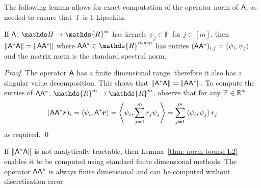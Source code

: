 \documentclass[smallextended]{svjour3}
\let\F\mathds\let\C\mathcal\newcommand{\R}{\F{R}}\newcommand{\A}{\tens{A}}
\newcommand{\norm}[1]{{\left\lVert #1 \right\rVert}}
\newcommand{\IP}[2]{\left\langle #1,#2 \right\rangle}
\newcommand{\op}[1]{\operatorname{#1}}
\newcommand{\1}{\F{1}}
\begin{document}
	The following lemma allows for exact computation of the operator norm of $\A$, as needed to ensure that $\op{f}$ is 1-Lipschitz.
	\begin{lemma}\label{thm: norm bound L2}
		If $\A\colon \F H \to \R^m$ has kernels $\psi_j\in \F H$ for $j\in[m]$, then
		$ \norm{\A^*\A} = \norm{\A\A^*} $
		where $\A\A^*\in\R^{m\times m}$ has entries $(\A\A^*)_{i,j} = \IP{\psi_i}{\psi_j}$
		and the matrix norm is the standard spectral norm.
	\end{lemma}
	\begin{proof}
		The operator $\A$ has a finite dimensional range, therefore it also has a singular value decomposition. This shows that $ \norm{\A^*\A} = \norm{\A\A^*} $. To compute the entries of $\A\A^*\colon\R^m\to\R^m$, observe that for any $\vec{r}\in\R^m$
		\begin{equation}
			(\A\A^*\vec{r})_i = \IP{\psi_i}{\A^*\vec{r}} = \IP{\psi_i}{\sum_{j=1}^mr_j\psi_j} = \sum_{j=1}^m \IP{\psi_i}{\psi_j}r_j
		\end{equation}
		as required.
		\qed\end{proof}
	If $\norm{\A^*\A}$ is not analytically tractable, then Lemma~\ref{thm: norm bound L2} enables it to be computed using standard finite dimensional methods. The operator $\A\A^*$ is always finite dimensional and can be computed without discretisation error.
	
\end{document}
